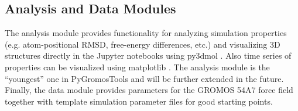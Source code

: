 \subsection{Analysis and Data Modules}
The analysis module provides functionality for analyzing simulation properties (e.g. atom-positional RMSD, free-energy differences, etc.) and visualizing 3D structures directly in the Jupyter notebooks using py3dmol \cite{Rego2014}. Also time series of properties can be visualized using matplotlib \cite{Hunter2007}. The analysis module is the ``youngest'' one in PyGromosTools and will be further extended in the future. 
Finally, the data module provides parameters for the GROMOS 54A7 force field \cite{Schmid2011} together with template simulation parameter files for good starting points.


